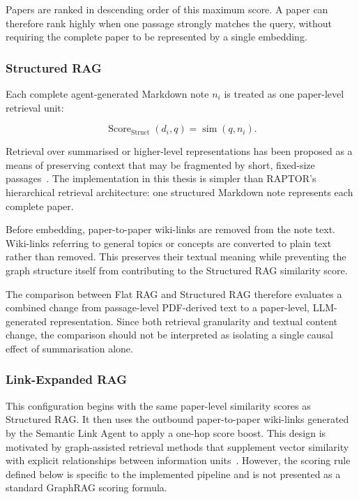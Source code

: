 \documentclass[runningheads]{llncs}
\begin{document}
Papers are ranked in descending order of this maximum score. A paper can
therefore rank highly when one passage strongly matches the query,
without requiring the complete paper to be represented by a single
embedding.

\subsubsection{Structured RAG}

Each complete agent-generated Markdown note \(n_i\) is treated as one
paper-level retrieval unit:

\[
\operatorname{Score}_{\mathrm{Struct}}(d_i,q)
=
\operatorname{sim}(q,n_i).
\]

Retrieval over summarised or higher-level representations has been
proposed as a means of preserving context that may be fragmented by
short, fixed-size passages~\cite{sarthi2024raptor}. The implementation
in this thesis is simpler than RAPTOR's hierarchical retrieval
architecture: one structured Markdown note represents each complete
paper.

Before embedding, paper-to-paper wiki-links are removed from the note
text. Wiki-links referring to general topics or concepts are converted
to plain text rather than removed. This preserves their textual meaning
while preventing the graph structure itself from contributing to the
Structured RAG similarity score.

The comparison between Flat RAG and Structured RAG therefore evaluates
a combined change from passage-level PDF-derived text to a paper-level,
LLM-generated representation. Since both retrieval granularity and
textual content change, the comparison should not be interpreted as
isolating a single causal effect of summarisation alone.

\subsubsection{Link-Expanded RAG}

This configuration begins with the same paper-level similarity scores
as Structured RAG. It then uses the outbound paper-to-paper wiki-links
generated by the Semantic Link Agent to apply a one-hop score boost.
This design is motivated by graph-assisted retrieval methods that
supplement vector similarity with explicit relationships between
information units~\cite{edge2024local}. However, the scoring rule
defined below is specific to the implemented pipeline and is not
presented as a standard GraphRAG scoring formula.
\end{document}
